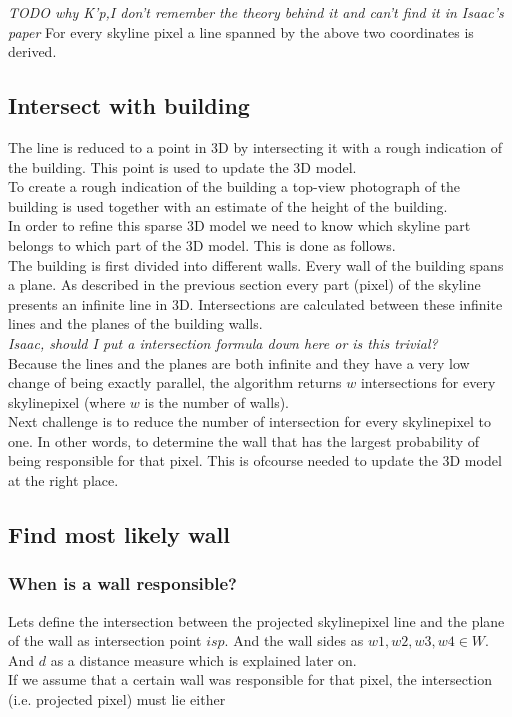 \documentclass[10pt]{article}
\begin{document}
\textit{ TODO why K'p,I don't remember the theory behind it and can't find it in Isaac's paper }
For every skyline pixel a line spanned by the above two coordinates is derived.

\subsection{Intersect with building}
The line is reduced to a point in 3D by intersecting it with a rough indication
of the building. This point is used to update the 3D model.\\
To create a rough indication of the building a top-view photograph of the
building is used together with an estimate of the height of the building.\\ 
In order to refine this sparse 3D model we need to know which skyline part belongs to which part of
the 3D model. This is done as follows.\\
The building is first divided into different walls.  Every wall of the building spans a plane. 
As described in the previous section every part (pixel) of the skyline presents an infinite line in 3D.
Intersections are calculated between these infinite lines and the planes of the building walls.\\
\textit{ Isaac, should I put a intersection formula down here or is this trivial?}\\
Because the lines and the planes are both infinite and they have a very low change
of being exactly parallel, the algorithm returns $w$ intersections for every
skylinepixel (where $w$ is the number of walls).\\
Next challenge is to reduce the number of intersection for every skylinepixel
to one. In other words, to determine the wall that has the largest probability of
being responsible for that pixel. This is ofcourse needed to update the 3D
model at the right place.

\subsection{Find most likely wall}
\subsubsection{When is a wall responsible?}
Lets define the intersection between the projected skylinepixel line and the
plane of the wall as intersection point $isp$. And the wall sides as ${w1, w2,
w3, w4 \in W}$. And $d$ as a distance measure which is explained later on.\\ If
we assume that a certain wall was responsible for that pixel, the intersection
(i.e. projected pixel) must lie either\\
\end{document}
